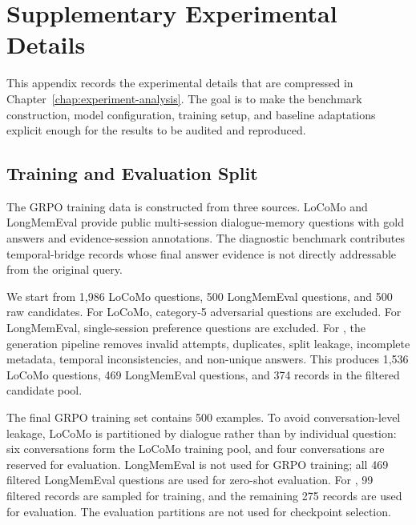 \chapter{Supplementary Experimental Details}
\label{app:experimental-details}

This appendix records the experimental details that are compressed in
Chapter~\ref{chap:experiment-analysis}. The goal is to make the benchmark
construction, model configuration, training setup, and baseline adaptations
explicit enough for the results to be audited and reproduced.

\section{Training and Evaluation Split}
\label{app:training-evaluation-split}

The GRPO training data is constructed from three sources. LoCoMo and
LongMemEval provide public multi-session dialogue-memory questions with gold
answers and evidence-session annotations. The diagnostic \bench{} benchmark
contributes temporal-bridge records whose final answer evidence is not directly
addressable from the original query.

We start from 1,986 LoCoMo questions, 500 LongMemEval questions, and 500 raw
\bench{} candidates. For LoCoMo, category-5 adversarial questions are excluded.
For LongMemEval, single-session preference questions are excluded. For
\bench{}, the generation pipeline removes invalid attempts, duplicates, split
leakage, incomplete metadata, temporal inconsistencies, and non-unique answers.
This produces 1,536 LoCoMo questions, 469 LongMemEval questions, and 374
\bench{} records in the filtered candidate pool.

The final GRPO training set contains 500 examples. To avoid conversation-level
leakage, LoCoMo is partitioned by dialogue rather than by individual question:
six conversations form the LoCoMo training pool, and four conversations are
reserved for evaluation. LongMemEval is not used for GRPO training; all 469
filtered LongMemEval questions are used for zero-shot evaluation. For
\bench{}, 99 filtered records are sampled for training, and the remaining 275
records are used for evaluation. The evaluation partitions are not used for
checkpoint selection.

